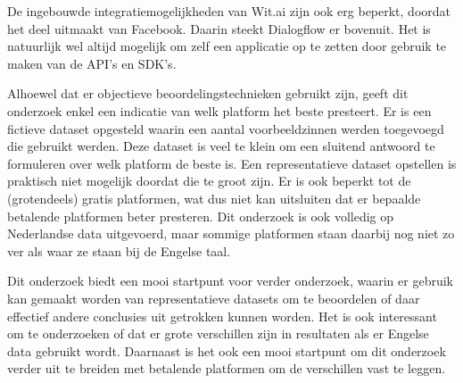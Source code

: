 De ingebouwde integratiemogelijkheden van Wit.ai zijn ook erg beperkt, doordat het deel uitmaakt van Facebook. Daarin steekt Dialogflow er bovenuit. Het is natuurlijk wel altijd mogelijk om zelf een applicatie op te zetten door gebruik te maken van de API’s en SDK’s.

Alhoewel dat er objectieve beoordelingstechnieken gebruikt zijn, geeft dit onderzoek enkel een indicatie van welk platform het beste presteert. Er is een fictieve dataset opgesteld waarin een aantal voorbeeldzinnen werden toegevoegd die gebruikt werden. Deze dataset is veel te klein om een sluitend antwoord te formuleren over welk platform de beste is. Een representatieve dataset opstellen is praktisch niet mogelijk doordat die te groot zijn. Er is ook beperkt tot de (grotendeels) gratis platformen, wat dus niet kan uitsluiten dat er bepaalde betalende platformen beter presteren. Dit onderzoek is ook volledig op Nederlandse data uitgevoerd, maar sommige platformen staan daarbij nog niet zo ver als waar ze staan bij de Engelse taal.

Dit onderzoek biedt een mooi startpunt voor verder onderzoek, waarin er gebruik kan gemaakt worden van representatieve datasets om te beoordelen of daar effectief andere conclusies uit getrokken kunnen worden. Het is ook interessant om te onderzoeken of dat er grote verschillen zijn in resultaten als er Engelse data gebruikt wordt. Daarnaast is het ook een mooi startpunt om dit onderzoek verder uit te breiden met betalende platformen om de verschillen vast te leggen.


